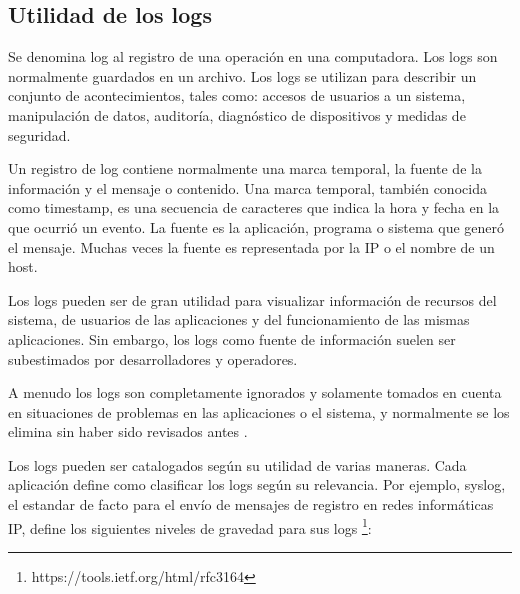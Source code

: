 \subsection{Utilidad de los logs}
\label{utilidad_de_los_logs}
Se denomina log al registro de una operación en una computadora. Los logs son normalmente guardados en un archivo. Los logs se utilizan para describir un conjunto de acontecimientos, tales como: accesos de usuarios a un sistema, manipulación de datos, auditoría, diagnóstico de dispositivos y medidas de seguridad.

Un registro de log contiene normalmente una marca temporal, la fuente de la información y el mensaje o contenido. Una marca temporal, también conocida como timestamp, es una secuencia de caracteres que indica la hora y fecha en la que ocurrió un evento. La fuente es la aplicación, programa o sistema que generó el mensaje. Muchas veces la fuente es representada por la IP o el nombre de un host.

Los logs pueden ser de gran utilidad para visualizar información de recursos del sistema, de usuarios de las aplicaciones y del funcionamiento de las mismas aplicaciones. Sin embargo, los logs como fuente de información suelen ser subestimados por desarrolladores y operadores.

A menudo los logs son completamente ignorados y solamente tomados en cuenta en situaciones de problemas en las aplicaciones o el sistema, y normalmente se los elimina sin haber sido revisados antes \cite[p.~16]{monitoreo:logging_and_log_management}.

Los logs pueden ser catalogados según su utilidad de varias maneras. Cada aplicación define como clasificar los logs según su relevancia. Por ejemplo, syslog, el estandar de facto para el envío de mensajes de registro en redes informáticas IP, define los siguientes niveles de gravedad para sus logs \footnote{https://tools.ietf.org/html/rfc3164}:

